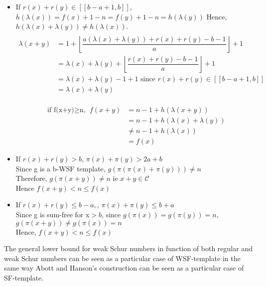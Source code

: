 \begin{itemize}
\item If \(r(x)+r(y) \in [\![b-a+1,b]\!]\), \(h(\lambda(x))=f(x)+1-n=f(y)+1-n=h(\lambda(y))\)
Hence, \(h(\lambda(x)+\lambda(y)) \neq h(\lambda(x))\).
\begin{align*}
 \\\lambda(x+y) & =1+\left\lfloor\dfrac{a(\lambda(x)+\lambda(y))+r(x)+r(y)-b-1}{a}\right\rfloor+1\\
& = \lambda(x)+\lambda(y)+\left\lfloor\dfrac{r(x)+r(y)-b-1}{a}\right\rfloor+1 \\
& = \lambda(x)+\lambda(y) -1 +1 \text{ since } r(x)+r(y) \in [\![b-a+1,b]\!] \\
& =\lambda(x)+\lambda(y)
\end{align*}


\begin{align*}
 \\\text{if f(x+y)\(\geqslant\)n, }f(x+y) & =n-1+h(\lambda(x+y))\\
& =n-1+h(\lambda(x)+\lambda(y)) \\
& \neq n-1+h(\lambda(x))\\
& =f(x)
\end{align*}


\item If \(r(x)+r(y)>b\), \(\pi(x)+\pi(y)>2a+b\)
\\Since g is a b-WSF template, \(g(\pi(\pi(x)+\pi(y))) \neq n\)
\\Therefore, \(g(\pi(x+y)) \neq n\) ie \(x+y \in \mathcal{C}\)
\\Hence \(f(x+y) <n\leqslant f(x)\)
\item If \(r(x)+r(y)\leqslant b-a,\), \(\pi(x)+\pi(y)\leqslant b+a\)
\\Since g is sum-free for x\(>b\), since \(g(\pi(x)) = g(\pi(y))=n\), \(g(\pi(x+y)) \neq g(\pi(x))=n\)
\\Hence, \(f(x+y) <n\leqslant f(x)\)
\end{itemize}

\begin{corollary}
The general lower bound for weak Schur numbers in function of both regular and weak Schur numbers can be seen as a particular
case of WSF-template in the same way Abott and Hanson's construction can be seen as a particular case of SF-template.
\end{corollary}

